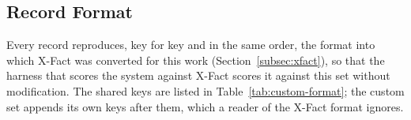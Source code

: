 
\subsection{Record Format}
\label{subsec:custom-format}

Every record reproduces, key for key and in the same order, the
format into which X-Fact was converted for this work
(Section~\ref{subsec:xfact}), so that the harness that scores the
system against X-Fact scores it against this set without
modification. The shared keys are listed in
Table~\ref{tab:custom-format}; the custom set appends its own keys
after them, which a reader of the X-Fact format ignores.

